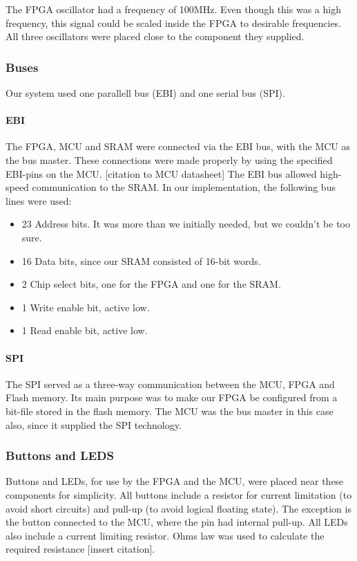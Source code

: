 The FPGA oscillator had a frequency of 100MHz.
Even though this was a high frequency, this signal could be scaled inside the FPGA to desirable frequencies.
All three oscillators were placed close to the component they supplied.

\subsubsection{Buses}
Our system used one parallell bus (EBI) and one serial bus (SPI).

\paragraph{EBI}
The FPGA, MCU and SRAM were connected via the EBI bus, with the MCU as the bus master. 
These connections were made properly by using the specified EBI-pins on the MCU. [citation to MCU datasheet]
The EBI bus allowed high-speed communication to the SRAM.
In our implementation, the following bus lines were used:
\begin{itemize}
\item 23 Address bits. It was more than we initially needed, but we couldn't be too sure.
\item 16 Data bits, since our SRAM consisted of 16-bit words.
\item 2 Chip select bits, one for the FPGA and one for the SRAM.
\item 1 Write enable bit, active low.
\item 1 Read enable bit, active low.
\end{itemize}

\paragraph{SPI}
The SPI served as a three-way communication between the MCU, FPGA and Flash memory.
Its main purpose was to make our FPGA be configured from a bit-file stored in the flash memory.
The MCU was the bus master in this case also, since it supplied the SPI technology.

\subsubsection{Buttons and LEDS}
Buttons and LEDs, for use by the FPGA and the MCU, were placed near these components for simplicity.
All buttons include a resistor for current limitation (to avoid short circuits) and pull-up (to avoid logical floating state).
The exception is the button connected to the MCU, where the pin had internal pull-up.
All LEDs also include a current limiting resistor.
Ohms law was used to calculate the required resistance [insert citation].

